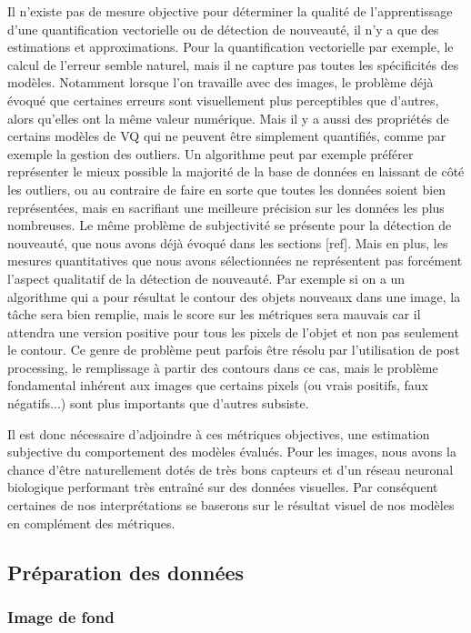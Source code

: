 	Il n'existe pas de mesure objective pour déterminer la qualité de l'apprentissage d'une quantification vectorielle ou de détection de nouveauté, il n'y a que des estimations et approximations. Pour la quantification vectorielle par exemple, le calcul de l'erreur semble naturel, mais il ne capture pas toutes les spécificités des modèles. Notamment lorsque l'on travaille avec des images, le problème déjà évoqué que certaines erreurs sont visuellement plus perceptibles que d'autres, alors qu'elles ont la même valeur numérique. Mais il y a aussi des propriétés de certains modèles de VQ qui ne peuvent être simplement quantifiés, comme par exemple la gestion des outliers. Un algorithme peut par exemple préférer représenter le mieux possible la majorité de la base de données en laissant de côté les outliers, ou au contraire de faire en sorte que toutes les données soient bien représentées, mais en sacrifiant une meilleure précision sur les données les plus nombreuses. Le même problème de subjectivité se présente pour la détection de nouveauté, que nous avons déjà évoqué dans les sections [ref]. Mais en plus, les mesures quantitatives que nous avons sélectionnées ne représentent pas forcément l'aspect qualitatif de la détection de nouveauté. Par exemple si on a un algorithme qui a pour résultat le contour des objets nouveaux dans une image, la tâche sera bien remplie, mais le score sur les métriques sera mauvais car il attendra une version positive pour tous les pixels de l'objet et non pas seulement le contour. Ce genre de problème peut parfois être résolu par l'utilisation de post processing, le remplissage à partir des contours dans ce cas, mais le problème fondamental inhérent aux images que certains pixels (ou vrais positifs, faux négatifs...) sont plus importants que d'autres subsiste.

	Il est donc nécessaire d'adjoindre à ces métriques objectives, une estimation subjective du comportement des modèles évalués. Pour les images, nous avons la chance d'être naturellement dotés de très bons capteurs et d'un réseau neuronal biologique performant très entraîné sur des données visuelles. Par conséquent certaines de nos interprétations se baserons sur le résultat visuel de nos modèles en complément des métriques.

	\subsection{Préparation des données}

	\subsubsection{Image de fond}

